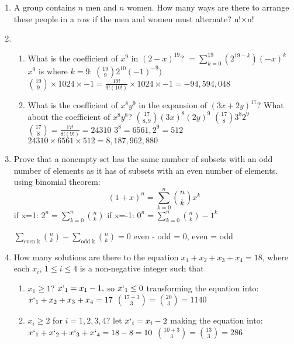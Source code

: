 \documentclass{article}
\begin{document}
\begin{enumerate}
\begin{enumerate}
			\subitem 
		\end{enumerate}
		
		\item A group contains $n$ men and $n$ women. How many ways are there to arrange these people in a row if the men and women must alternate?
		\subitem n!$\times$n!
		
		\item 
		\begin{enumerate}
			\item What is the coefficient of $x^9$ in $(2 - x)^{19}$?
			\subitem $ = \sum_{k=0}^{19}(2^{19-k})(-x)^k$
			\subitem $x^9$ is where $k=9$: $\binom{19}{9}2^10(-1)^{-9})$
			\subitem $\binom{19}{9}\times 1024 \times -1 = \frac{19!}{9!(10!)} \times 1024 \times -1 = -94,594,048 $
			
			
			\item What is the coefficient of $x^8y^9$ in the expansion of $(3x + 2y)^{17}$? What about the coefficient of $x^8y^8$?
			\subitem $\binom{17}{8,9}(3x)^8(2y)^9$ 
			\subitem $\binom{17}{8}3^8 2^9$ 
			\subitem $\binom{17}{8} = \frac{17!}{8!(9!)} = 24310$
			\subitem $3^8 = 6561, 2^9 = 512$
			\subitem $24310\times6561\times512 = 8,187,962,880$
		\end{enumerate}
		
		\item Prove that a nonempty set has the same number of subsets with an odd number of elements as it has of subsets with an even number of elements.
		\subitem using binomial theorem: 
		$$(1+x)^n = \sum_{k=0}^n \binom{n}{k} x^k$$
		\subitem if x=1:
		\subitem$ 2^n =\sum_{k=0}^n \binom{n}{k}$ 
		\subitem if x=-1:
		\subitem$ 0^n =\sum_{k=0}^n \binom{n}{k} -1^k$ 
		
		\subitem $\sum_{\text{even k}}\binom{n}{k} - \sum_{\text{odd k}}\binom{n}{k} = 0$
		\subitem even - odd = 0, even = odd	
		
		\item How many solutions are there to the equation $x_1 + x_2 + x_3 + x_4 = 18$, where each $x_i$, $1 \leq i \leq 4$ is a non-negative integer such that
		\begin{enumerate}
			\item $x_1 \geq 1$?
			\subitem $x`_1 = x_1 - 1,$ so $x`_1 \leq 0 $ transforming the equation into:
			\subitem $x`_1 + x_2 + x_3 + x_4 = 17$
			\subitem $\binom{17+3}{3} = \binom{20}{3} = 1140$
			
			\item $x_i \geq 2$ for $i = 1,2,3,4$?
			\subitem let $x`_i = x_i-2$ making the equation into: 
			\subitem $x`_1 + x`_2 + x`_3 + x`_4 =18-8=10$
			\subitem $\binom{10+3}{3} = \binom{13}{3} = 286$
			

\end{enumerate}
\end{enumerate}
\end{document}
